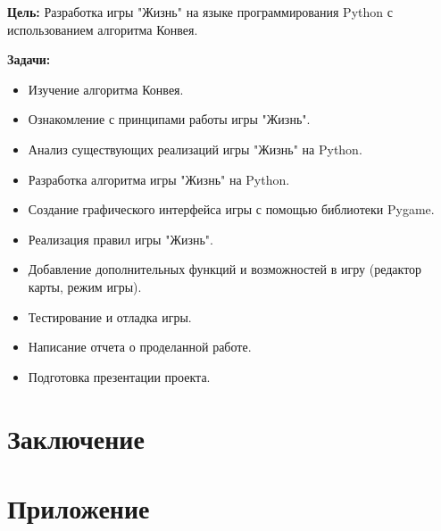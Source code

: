 \documentclass[14pt, oneside]{altsu-report}
\begin{document}
\textbf{Цель:} Разработка игры "Жизнь" на языке программирования Python с использованием алгоритма Конвея.

\textbf{Задачи:}
\begin{itemize}
    \item Изучение алгоритма Конвея.
    \item Ознакомление с принципами работы игры "Жизнь".
    \item Анализ существующих реализаций игры "Жизнь" на Python.
    \item Разработка алгоритма игры "Жизнь" на Python.
    \item Создание графического интерфейса игры с помощью библиотеки Pygame.
    \item Реализация правил игры "Жизнь".
    \item Добавление дополнительных функций и возможностей в игру (редактор карты, режим игры).
    \item Тестирование и отладка игры.
    \item Написание отчета о проделанной работе.
    \item Подготовка презентации проекта.
\end{itemize}





\chapter*{Заключение}

\newpage
{}
\printbibliography[title={Список использованной литературы}]
\nocite{*}

\appendix
\newpage
\chapter*{\raggedleft\label{appendix1}Приложение}

\begin{center}
\label{code:appendix}
\end{center}

\begin{code}

\end{code}
\end{document}
